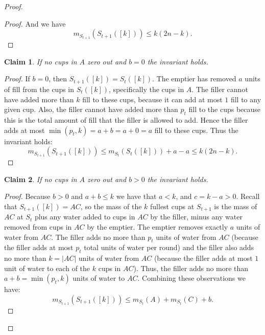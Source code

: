\documentclass[twocolumn]{article}[10pt]
\newtheorem{clm}{Claim}
\begin{document}
\begin{proof}
\begin{proof}
  And we have
  $$m_{S_{t+1}}(S_{t+1}([k])) \le k(2n-k).$$
\end{proof}

\begin{clm}
  If no cups in $A$ zero out and $b=0$ the invariant holds.
\end{clm}
\begin{proof}
If $b=0$, then $S_{t+1}([k]) = S_t([k])$. 
The emptier has removed $a$ units of fill from the cups in $S_t([k])$,
specifically the cups in $A$. The filler cannot have added more than $k$ fill
to these cups, because it can add at most $1$ fill to any given cup. Also, the
filler cannot have added more than $p_t$ fill to the cups because this is the
total amount of fill that the filler is allowed to add. Hence the filler adds
at most $\min(p_t, k) = a+b=a+0=a$ fill to these cups.
Thus the invariant holds:
$$m_{S_{t+1}}(S_{t+1}([k])) \le m_{S_t}(S_t([k]))+a-a \le k(2n-k).$$

\end{proof}

\begin{clm}
  If no cups in $A$ zero out and $b > 0$ the invariant holds.
\end{clm}
\begin{proof}
Because $b>0$ and $a+b \le k$ we have that $a
< k$, and $c = k-a > 0$. Recall that $S_{t+1}([k]) = AC$, so the mass of the
$k$ fullest cups at $S_{t+1}$ is the mass of $AC$ at $S_t$ plus any water added
to cups in $AC$ by the filler, minus any water removed from cups in $AC$ by the
emptier. The emptier removes exactly $a$ units of water from $AC$.
The filler adds no more than $p_t$ units of water from $AC$ (because the filler
adds at most $p_t$ total units of water per round) and the filler also
adds no more than $k = |AC|$ units of water from $AC$ (because the filler adds
at most $1$ unit of water to each of the $k$ cups in $AC$).
Thus, the filler adds no more than $a+b = \min(p_t, k)$ units of water to $AC$.
Combining these observations we have:
$$m_{S_{t+1}}(S_{t+1}([k])) \le m_{S_t}(A) + m_{S_t}(C) + b.$$


\end{proof}
\end{proof}
\end{document}
